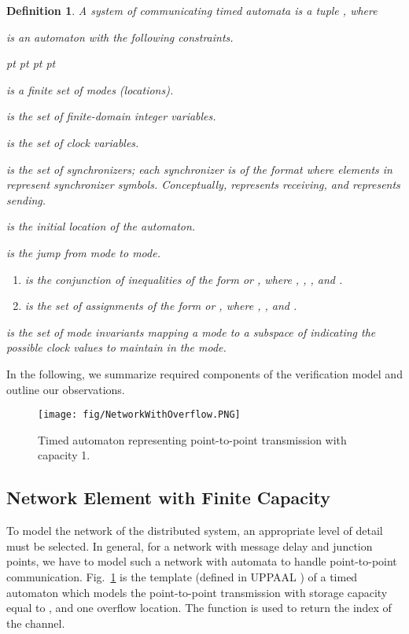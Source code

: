 \documentclass[10pt, a4paper, onecolumn, conference, compsocconf]{IEEEtran}
\newenvironment{list1}{\begin{list}{}
{\topsep 0 pt \parsep 0 pt \partopsep 0 pt \itemsep 0
pt}}{\end{list}}
\newtheorem{defi}{Definition}
\begin{document}
\begin{defi} A system of communicating timed automata is a tuple
, where

  is
an automaton with the following constraints.
\begin{list1}
\item  is a finite set of \emph{modes} (\emph{locations}).

\item  is the set of finite-domain integer variables.

\item  is the set of
\emph{clock variables}.

\item  is the set of
\emph{synchronizers}; each synchronizer  is of the format  where elements in  represent
synchronizer symbols. Conceptually,  represents receiving,
and  represents sending.

\item  is the \emph{initial location} of the
automaton.

\item 
is the jump from mode to mode.
\begin{enumerate}
\item  is the conjunction of inequalities
    of the form  or , where , , , and .
\item  is the set of assignments of the form  or , where , , and .
\end{enumerate}

\item  is the set of mode invariants mapping a mode to a
subspace of  indicating the possible clock
values to maintain in the mode.
\end{list1}
\end{defi}

In the following, we summarize required components of the verification model and outline our observations.
\begin{figure}
 \centering
 \texttt{[image: fig/NetworkWithOverflow.PNG]}
 \caption{Timed automaton representing point-to-point transmission with capacity 1.}
 \label{fig:TA.p2p}
\end{figure}
\subsection{Network Element with Finite Capacity\label{sec.Network.Finite.Capacities}}
To model the network of the distributed system, an appropriate level of detail must be selected. In general, for a network with message delay and  junction points, we have to model such a network with  automata to handle point-to-point communication. Fig.~\ref{fig:TA.p2p} is the template (defined in UPPAAL \cite{bdl:2004:uppaal}) of a timed automaton  which models the point-to-point transmission with storage capacity equal to , and one overflow location. The function  is used to return the index of the channel.
\end{document}
